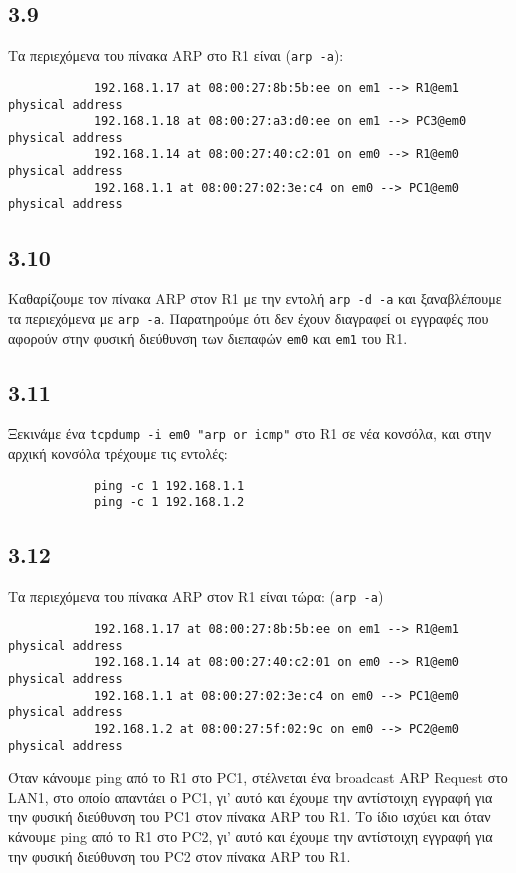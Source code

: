 \documentclass[a4paper, 12pt]{article}
\begin{document}
	\subsection*{3.9}
		Τα περιεχόμενα του πίνακα ARP στο R1 είναι (\verb|arp -a|): 
		
		\begin{verbatim}
			192.168.1.17 at 08:00:27:8b:5b:ee on em1 --> R1@em1 physical address
			192.168.1.18 at 08:00:27:a3:d0:ee on em1 --> PC3@em0 physical address
			192.168.1.14 at 08:00:27:40:c2:01 on em0 --> R1@em0 physical address
			192.168.1.1 at 08:00:27:02:3e:c4 on em0 --> PC1@em0 physical address
		\end{verbatim}
		
	\subsection*{3.10}
		Καθαρίζουμε τον πίνακα ARP στον R1 με την εντολή \verb|arp -d -a| και ξαναβλέπουμε τα περιεχόμενα με \verb|arp -a|. Παρατηρούμε ότι δεν έχουν διαγραφεί οι εγγραφές που αφορούν στην φυσική διεύθυνση των διεπαφών \verb|em0| και \verb|em1| του R1.

	\subsection*{3.11}
		Ξεκινάμε ένα \verb|tcpdump -i em0 "arp or icmp"| στο R1 σε νέα κονσόλα, και στην αρχική κονσόλα τρέχουμε τις εντολές:
		
		\begin{verbatim}
			ping -c 1 192.168.1.1
			ping -c 1 192.168.1.2
		\end{verbatim}
		
	\subsection*{3.12}
		Τα περιεχόμενα του πίνακα ARP στον R1 είναι τώρα: (\verb|arp -a|)

		\begin{verbatim}
			192.168.1.17 at 08:00:27:8b:5b:ee on em1 --> R1@em1 physical address
			192.168.1.14 at 08:00:27:40:c2:01 on em0 --> R1@em0 physical address
			192.168.1.1 at 08:00:27:02:3e:c4 on em0 --> PC1@em0 physical address
			192.168.1.2 at 08:00:27:5f:02:9c on em0 --> PC2@em0 physical address
		\end{verbatim}
		
		Όταν κάνουμε ping από το R1 στο PC1, στέλνεται ένα broadcast ARP Request στο LAN1, στο οποίο απαντάει ο PC1, γι' αυτό και έχουμε την αντίστοιχη εγγραφή για την φυσική διεύθυνση του PC1 στον πίνακα ARP του R1. Το ίδιο ισχύει και όταν κάνουμε ping από το R1 στο PC2, γι' αυτό και έχουμε την αντίστοιχη εγγραφή για την φυσική διεύθυνση του PC2 στον πίνακα ARP του R1. 
\end{document}
